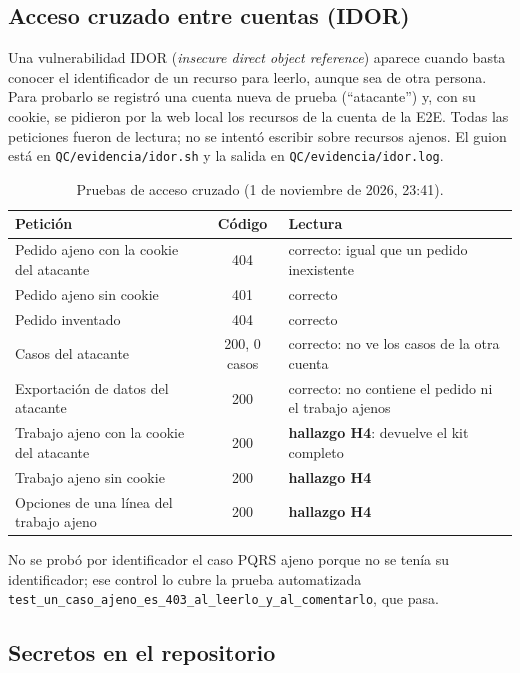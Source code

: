 \documentclass[11pt,letterpaper]{article}
\newcommand{\ruta}[1]{\texttt{\small #1}}
\begin{document}
\subsection{Acceso cruzado entre cuentas (IDOR)}

Una vulnerabilidad IDOR (\emph{insecure direct object reference}) aparece cuando basta conocer el
identificador de un recurso para leerlo, aunque sea de otra persona. Para probarlo se registró una cuenta
nueva de prueba (``atacante'') y, con su cookie, se pidieron por la web local los recursos de la cuenta de la
E2E. Todas las peticiones fueron de lectura; no se intentó escribir sobre recursos ajenos. El guion está en
\ruta{QC/\allowbreak{}evidencia/\allowbreak{}idor.sh} y la salida en \ruta{QC/\allowbreak{}evidencia/\allowbreak{}idor.log}.

\begin{table}[h]
\centering\small
\caption{Pruebas de acceso cruzado (1 de noviembre de 2026, 23:41).}
\begin{tabular}{L{6.3cm}cL{6.2cm}}
\toprule
Petición & Código & Lectura \\
\midrule
Pedido ajeno con la cookie del atacante & 404 & correcto: igual que un pedido inexistente \\
Pedido ajeno sin cookie & 401 & correcto \\
Pedido inventado & 404 & correcto \\
Casos del atacante & 200, 0 casos & correcto: no ve los casos de la otra cuenta \\
Exportación de datos del atacante & 200 & correcto: no contiene el pedido ni el trabajo ajenos \\
Trabajo ajeno con la cookie del atacante & 200 & \textbf{hallazgo H4}: devuelve el kit completo \\
Trabajo ajeno sin cookie & 200 & \textbf{hallazgo H4} \\
Opciones de una línea del trabajo ajeno & 200 & \textbf{hallazgo H4} \\
\bottomrule
\end{tabular}
\end{table}

No se probó por identificador el caso PQRS ajeno porque no se tenía su identificador; ese control lo cubre la
prueba automatizada \ruta{test\_\allowbreak{}un\_\allowbreak{}caso\_\allowbreak{}ajeno\_\allowbreak{}es\_\allowbreak{}403\_\allowbreak{}al\_\allowbreak{}leerlo\_\allowbreak{}y\_\allowbreak{}al\_\allowbreak{}comentarlo}, que pasa.

\subsection{Secretos en el repositorio}
\end{document}
